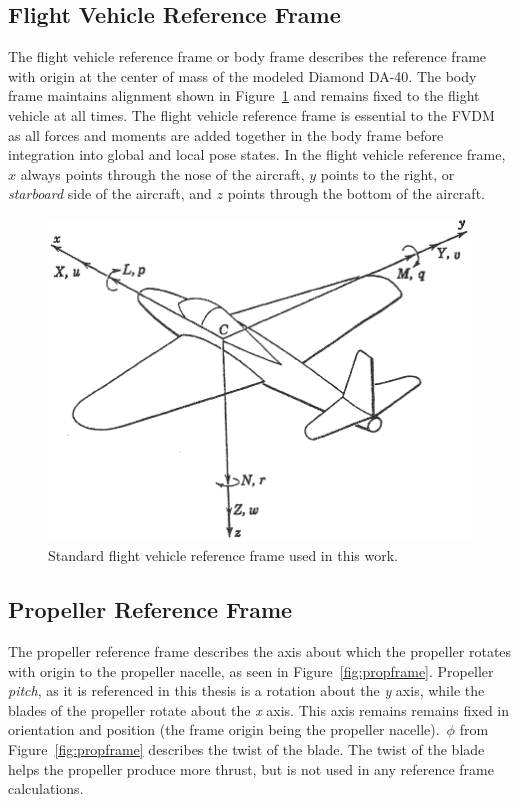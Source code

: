 \subsection{\textbf{Flight Vehicle Reference Frame}}\label{section:FVRF}
The flight vehicle reference frame or body frame describes the reference frame with origin at the center of mass of the modeled Diamond DA-40. The body frame maintains alignment shown in Figure~\ref{fig:flightvehiclereferenceframe} and remains fixed to the flight vehicle at all times. The flight vehicle reference frame is essential to the FVDM as all forces and moments are added together in the body frame before integration into global and local pose states. In the flight vehicle reference frame, \(x\) always points through the nose of the aircraft, \(y\) points to the right, or \textit{starboard} side of the aircraft, and \(z\) points through the bottom of the aircraft.

\begin{figure}[!ht]
    \centering
    \includegraphics[width=0.60\linewidth]{Figures/bodyframe.png}
    \caption{Standard flight vehicle reference frame used in this work.~\cite{peetSpacecraftAircraftDynamics2021}}\label{fig:flightvehiclereferenceframe}
\end{figure}
\clearpage
\subsection{\textbf{Propeller Reference Frame}}
The propeller reference frame describes the axis about which the propeller rotates with origin to the propeller nacelle, as seen in Figure~\ref{fig:propframe}. Propeller \textit{pitch}, as it is referenced in this thesis is a rotation about the \textit{y} axis, while the blades of the propeller rotate about the \textit{x} axis. This axis remains remains fixed in orientation and position (the frame origin being the propeller nacelle).~\( \phi{}\) from Figure~\ref{fig:propframe} describes the twist of the blade. The twist of the blade helps the propeller produce more thrust, but is not used in any reference frame calculations.

